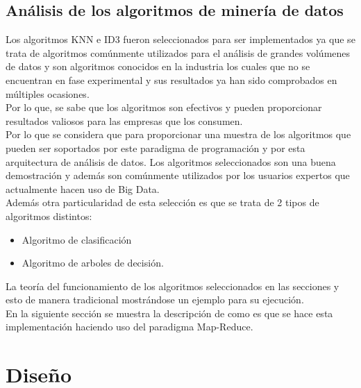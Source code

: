 \subsection{Análisis de los algoritmos de minería de datos}
Los algoritmos KNN e ID3 fueron seleccionados para ser implementados ya que se trata de algoritmos comúnmente utilizados para el análisis de grandes volúmenes de datos y son algoritmos conocidos en la industria los cuales que no se encuentran en fase experimental y sus resultados ya han sido comprobados en múltiples ocasiones.
\\
Por lo que, se sabe que los algoritmos son efectivos y pueden proporcionar resultados valiosos para las empresas que los consumen.
\\
Por lo que se considera que para proporcionar una muestra de los algoritmos que pueden ser soportados por este paradigma de programación y por esta arquitectura de análisis de datos. Los algoritmos seleccionados son una buena demostración y además son comúnmente utilizados por los usuarios expertos que actualmente hacen uso de Big Data.
\\
Además otra particularidad de esta selección es que se trata de 2 tipos de algoritmos distintos: 
\begin{itemize}
	\item Algoritmo de clasificación
	\item Algoritmo de arboles de decisión.
\end{itemize} 

La teoría del funcionamiento de los algoritmos seleccionados en las secciones  y  esto de manera tradicional mostrándose un ejemplo para su ejecución.
\\
En la siguiente sección se muestra la descripción de como es que se hace esta implementación haciendo uso del paradigma Map-Reduce. 

\section{Diseño}

